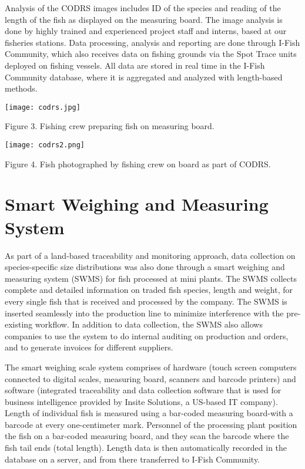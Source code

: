 Analysis of the CODRS images includes ID of the species and reading of the length of the fish as displayed on the measuring board. The image analysis is done by highly trained and experienced project staff and interns, based at our fisheries stations. Data processing, analysis and reporting are done through I-Fish Community, which also receives data on fishing grounds via the Spot Trace units deployed on fishing vessels. All data are stored in real time in the I-Fish Community database, where it is aggregated and analyzed with length-based methods.

\begin{center}
\graphicspath{{/root/R-project/IFishSnapperWPP573/Images/}}
\texttt{[image: codrs.jpg]}

Figure 3. Fishing crew preparing fish on measuring board.
\end{center}

\begin{center}
\graphicspath{{/root/R-project/IFishSnapperWPP573/Images/}}
\texttt{[image: codrs2.png]}

Figure 4. Fish photographed by fishing crew on board as part of CODRS.
\end{center}

\clearpage
\newpage

\section{Smart Weighing and Measuring System}

As part of a land-based traceability and monitoring approach, data collection on species-specific size distributions was also done through a smart weighing and measuring system (SWMS) for fish processed at mini plants. The SWMS collects complete and detailed information on traded fish species, length and weight, for every single fish that is received and processed by the company. The SWMS is inserted seamlessly into the production line to minimize interference with the pre-existing workflow. In addition to data collection, the SWMS also allows companies to use the system to do internal auditing on production and orders, and to generate invoices for different suppliers.

The smart weighing scale system comprises of hardware (touch screen computers connected to digital scales, measuring board, scanners and barcode printers) and software (integrated traceability and data collection software that is used for business intelligence provided by Insite Solutions, a US-based IT company). Length of individual fish is measured using a bar-coded measuring board-with a barcode at every one-centimeter mark. Personnel of the processing plant position the fish on a bar-coded measuring board, and they scan the barcode where the fish tail ends (total length). Length data is then automatically recorded in the database on a server, and from there transferred to I-Fish Community.

